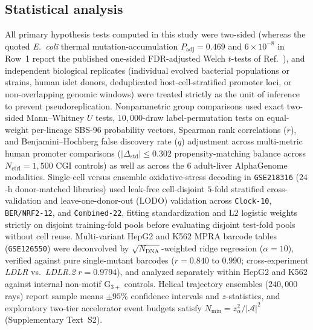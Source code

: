 \documentclass[10pt,letterpaper]{article}
\theoremstyle{plain}
\theoremstyle{definition}
\begin{document}
\subsection*{Statistical analysis}

All primary hypothesis tests computed in this study were two-sided (whereas the quoted \emph{E.\ coli} thermal mutation-accumulation $P_{\mathrm{adj}} = 0.469$ and $6 \times 10^{-8}$ in Row~1 report the published one-sided FDR-adjusted Welch $t$-tests of Ref.~\cite{chu2018bmcevol}), and independent biological replicates (individual evolved bacterial populations or strains, human islet donors, deduplicated host-cell-stratified promoter loci, or non-overlapping genomic windows) were treated strictly as the unit of inference to prevent pseudoreplication. Nonparametric group comparisons used exact two-sided Mann--Whitney $U$ tests, $10{,}000$-draw label-permutation tests on equal-weight per-lineage SBS-96 probability vectors, Spearman rank correlations ($r$), and Benjamini--Hochberg false discovery rate ($q$) adjustment across multi-metric human promoter comparisons ($|\Delta_{\mathrm{std}}| \le 0.302$ propensity-matching balance across $N_{\mathrm{ctrl}} = 1{,}500$ CGI controls) as well as across the $6$ adult-liver AlphaGenome modalities. Single-cell versus ensemble oxidative-stress decoding in \texttt{GSE218316} ($24$-h donor-matched libraries) used leak-free cell-disjoint $5$-fold stratified cross-validation and leave-one-donor-out ($\mathrm{LODO}$) validation across \texttt{Clock-10}, \texttt{BER/NRF2-12}, and \texttt{Combined-22}, fitting standardization and $\mathrm{L2}$ logistic weights strictly on disjoint training-fold pools before evaluating disjoint test-fold pools without cell reuse. Multi-variant HepG2 and K562 MPRA barcode tables (\texttt{GSE126550}) were deconvolved by $\sqrt{N_{\mathrm{DNA}}}$-weighted ridge regression ($\alpha = 10$), verified against pure single-mutant barcodes ($r = 0.840$ to $0.990$; cross-experiment \emph{LDLR} vs.\ \emph{LDLR.2} $r = 0.9794$), and analyzed separately within HepG2 and K562 against internal non-motif $\mathrm{G}_{3+}$ controls. Helical trajectory ensembles ($240{,}000$ rays) report sample means $\pm 95\%$ confidence intervals and $z$-statistics, and exploratory two-tier accelerator event budgets satisfy $N_{\min} = z_\alpha^2 / |\mathcal{A}|^2$ (Supplementary Text~S2).

\renewcommand{\refname}{References and Notes}


\end{document}
